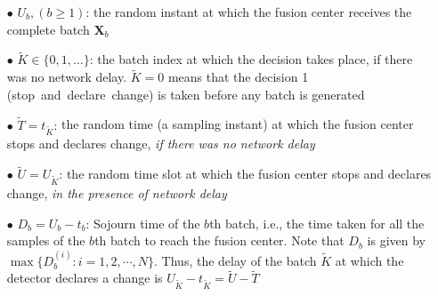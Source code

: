 \documentclass[acmtosn]{acmtrans2m}
\begin{document}
\begin{itemize}
\item[$\bullet$]{$U_b, (b \geqslant 1)$:} the random instant at which the fusion
    center receives the complete batch $\mathbf{X}_b$

\item[$\bullet$]{$\widetilde{K} \in \{0,1,\dots\}$:} the batch index at which the
    decision takes place, if there was no network delay. $\widetilde{K} = 0$
    means that the decision 1 ({\sf stop~and~declare~change}) is taken
    before any batch is generated

\item[$\bullet$]{$\widetilde{T}=t_{\widetilde{K}}$:} the random time (a sampling
    instant) at which the fusion center stops and declares change, {\em if
    there was no network delay} 

\item[$\bullet$]{$\widetilde{U}=U_{\widetilde{K}}$:} the random time slot at which the
    fusion center stops and declares change, {\em in the presence of
    network delay}

  \item[$\bullet$]{$D_b=U_b-t_b$:} Sojourn time of the $b$th batch, i.e., the
    time taken for all the samples of the $b$th batch to reach the
    fusion center. Note that $D_b$ is given by $\max\{D_b^{(i)}:i=1,2,\cdots,N\}$.
    Thus, the delay of the batch $\widetilde{K}$ at which the detector
    declares a change is $U_{\widetilde{K}} - t_{\widetilde{K}} = \widetilde{U}-\widetilde{T}$
\end{itemize}
    
\end{document}
